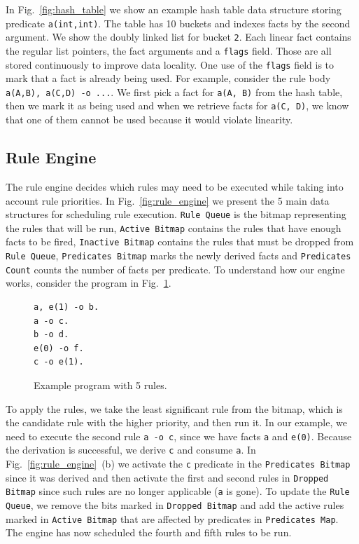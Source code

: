 In Fig.~\ref{fig:hash_table} we show an example hash table data structure storing predicate \texttt{a(int,int)}. The table
has 10 buckets and indexes facts by the second argument. We show the doubly linked list for bucket \texttt{2}. Each linear fact
contains the regular list pointers, the fact arguments and a \texttt{flags} field. Those are all stored continuously to improve data
locality. One use of the \texttt{flags} field is to mark that a fact is already being used. For example,
consider the rule body \texttt{a(A,B), a(C,D) -o ...}. We first pick a fact for \texttt{a(A, B)} from the hash table, then we mark it as
being used and when we retrieve facts for \texttt{a(C, D)}, we know that one of them cannot be used because it would
violate linearity.

\subsection{Rule Engine}\label{rule_engine}

The rule engine decides which rules may need to be executed while taking into account rule priorities.
In Fig.~\ref{fig:rule_engine} we present the 5 main data structures for scheduling rule execution.
\texttt{Rule Queue} is the bitmap representing the rules that will be run, \texttt{Active Bitmap} contains the rules that have enough
facts to be fired, \texttt{Inactive Bitmap} contains the rules that must be dropped from \texttt{Rule Queue}, \texttt{Predicates Bitmap}
marks the newly derived facts and \texttt{Predicates Count} counts the number of facts per predicate.
To understand how our engine works, consider
the program in Fig.~\ref{code:5rules}.

\begin{figure}
\vspace{-1\intextsep}
\footnotesize\begin{Verbatim}
a, e(1) -o b.
a -o c.
b -o d.
e(0) -o f.
c -o e(1).
\end{Verbatim}
\caption{\small{Example program with 5 rules.}}
\label{code:5rules}
\vspace{-0.5\intextsep}
\end{figure}

To apply the rules, we take the least significant rule from the bitmap, which is the candidate rule with the higher priority, and then run it. In our example, we need to execute the second rule \texttt{a -o c}, since we have facts \texttt{a} and \texttt{e(0)}.
Because the derivation is successful, we derive \texttt{c} and consume \texttt{a}. In Fig.~\ref{fig:rule_engine}~(b) we
activate the \texttt{c} predicate in the \texttt{Predicates Bitmap} since it was derived and then activate the first and second rules
in \texttt{Dropped Bitmap} since such rules are no longer applicable (\texttt{a} is gone). To update the \texttt{Rule Queue},
we remove the bits marked in \texttt{Dropped Bitmap} and add the active rules marked in \texttt{Active Bitmap} that are affected
by predicates in \texttt{Predicates Map}. The engine has now scheduled the fourth and fifth rules to be run.


